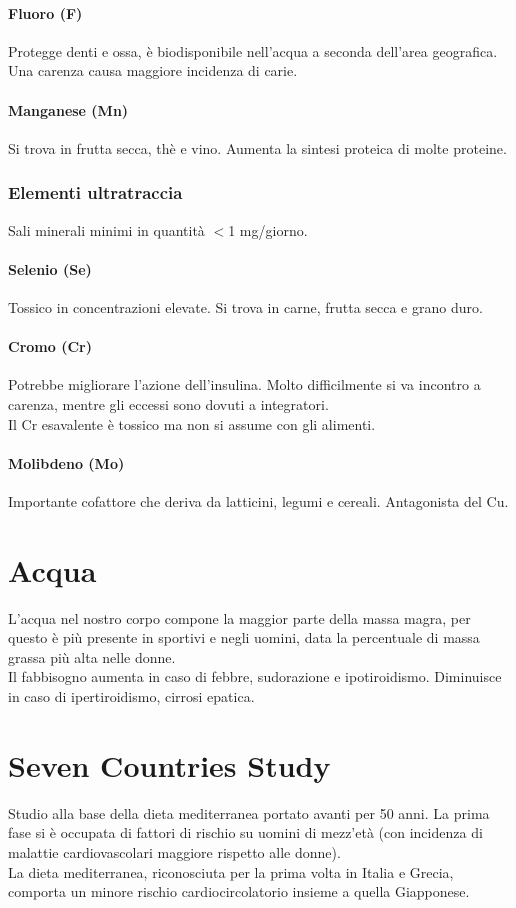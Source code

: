 \documentclass[10pt]{article}
\begin{document}
\paragraph{Fluoro (F)} Protegge denti e ossa, è biodisponibile nell'acqua a seconda dell'area geografica. Una carenza causa maggiore incidenza di carie.
\paragraph{Manganese (Mn)} Si trova in frutta secca, thè e vino. Aumenta la sintesi proteica di molte proteine.
\subsubsection{Elementi ultratraccia}
Sali minerali minimi in quantità $<$1 mg/giorno.
\paragraph{Selenio (Se)} Tossico in concentrazioni elevate. Si trova in carne, frutta secca e grano duro.
\paragraph{Cromo (Cr)} Potrebbe migliorare l'azione dell'insulina. Molto difficilmente si va incontro a carenza, mentre gli eccessi sono dovuti a integratori.\\
Il Cr esavalente è tossico ma non si assume con gli alimenti.
\paragraph{Molibdeno (Mo)} Importante cofattore che deriva da latticini, legumi e cereali. Antagonista del Cu.
\section{Acqua}
L'acqua nel nostro corpo compone la maggior parte della massa magra, per questo è più presente in sportivi e negli uomini, data la percentuale di massa grassa più alta nelle donne.\\
Il fabbisogno aumenta in caso di febbre, sudorazione e ipotiroidismo. Diminuisce in caso di ipertiroidismo, cirrosi epatica. 
\section{Seven Countries Study}
Studio alla base della dieta mediterranea portato avanti per 50 anni. La prima fase si è occupata di fattori di rischio su uomini di mezz'età (con incidenza di malattie cardiovascolari maggiore rispetto alle donne).\\
La dieta mediterranea, riconosciuta per la prima volta in Italia e Grecia, comporta un minore rischio cardiocircolatorio insieme a quella Giapponese.
\end{document}
